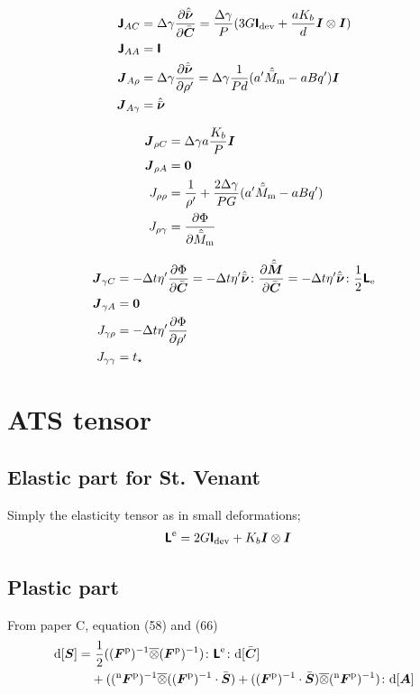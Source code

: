 \documentclass[a4paper,11pt]{article}
\newcommand{\ootimes}{\overline{\otimes}}
\newcommand{\tf}[1]{\text{\boldmath $\sf #1$}}
\newcommand{\ts}[1]{\text{\boldmath $#1$}}
\newcommand{\pderiv}[2]{\frac{\partial #1}{\partial #2}}
\newcommand{\dev}{{\rm dev}}
\newcommand{\rmd}{{\rm d}}
\newcommand{\rme}{{\rm e}}
\newcommand{\rmm}{{\rm m}}
\newcommand{\rmp}{{\rm p}}
\newcommand{\old}{{}^{\rm n}}
\begin{document}
\begin{align*}
	\tf J_{A C}  &= \Delta\gamma\pderiv{\hat{\bar{\ts\nu}}}{\bar{\ts C}} = \frac{\Delta\gamma}{P}(3G\tf I_\dev + \frac{a K_b}{d}\ts I\otimes\ts I)\\
	\tf J_{A A} &= \tf I\\
	\ts J_{A \rho}   &= \Delta\gamma\pderiv{\hat{\bar{\ts\nu}}}{\rho'} = \Delta\gamma\frac1{P d}(a'\hat{\bar M}_\rmm - a B q')\ts I\\
	\ts J_{A \gamma} &= \hat{\bar{\ts\nu}}
\end{align*}

\begin{align*}
	\ts J_{\rho C}  &= \Delta\gamma a \frac{K_b}{P} \ts I\\
	\ts J_{\rho A}  &= \ts 0\\
	J_{\rho \rho}   &= \frac{1}{\rho'} + \frac{2\Delta\gamma}{PG}(a' \hat{\bar M}_\rmm - a B q')\\
	J_{\rho \gamma} &= \pderiv{\Phi}{\hat{\bar M}_\rmm}
\end{align*}

\begin{align*}
	\ts J_{\gamma C}  &= -\Delta t \eta' \pderiv{\Phi}{\bar{\ts C}} 
					= -\Delta t \eta' \hat{\bar{\ts\nu}}\colon\pderiv{\hat{\bar{\ts M}}}{\bar{\ts C}}
					= -\Delta t \eta' \hat{\bar{\ts\nu}}\colon\frac12 \tf L_\rme\\
	\ts J_{\gamma A} &= \ts 0\\
	J_{\gamma \rho}   &= -\Delta t \eta'\pderiv{\Phi}{\rho'}\\
	J_{\gamma \gamma} &= t_\star
\end{align*}

\section{ATS tensor}
\subsection{Elastic part for St. Venant}
Simply the elasticity tensor as in small deformations;
\begin{align*}
	\tf L^\rme &= 2 G \tf I_\dev + K_b \ts I\otimes \ts I
\end{align*}

\subsection{Plastic part}
From paper C, equation (58) and (66)
\begin{align*}
	\rmd[\ts S] =&\ \frac12((\ts F^\rmp)^{-1}\ootimes(\ts F^\rmp)^{-1})\colon \tf L^\rme \colon \rmd[\bar{\ts C}] \\
	&+ ((\old\ts F^\rmp)^{-1}\ootimes((\ts F^\rmp)^{-1}\cdot \bar{\ts S})+((\ts F^\rmp)^{-1}\cdot \bar{\ts S})\ootimes (\old \ts F^\rmp)^{-1})\colon\rmd[\ts A]
\end{align*}
\end{document}
